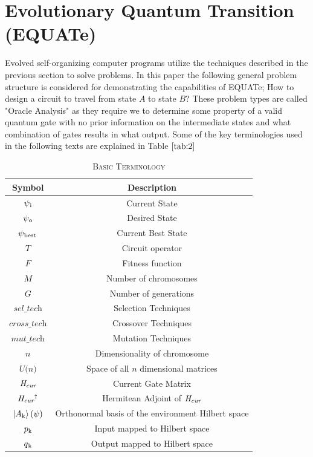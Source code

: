 \documentclass[conference]{IEEEtran}
\begin{document}
\section{Evolutionary Quantum Transition (EQUATe)}

Evolved self-organizing computer programs \cite{self} utilize the techniques described in the previous section to solve problems. In this paper the following general problem structure is considered for demonstrating the capabilities of EQUATe; How to design a circuit to travel from state $\textit{A}$ to state $\textit{B}$? These problem types are called "Oracle Analysis" \cite{oracle} as they require we to determine some property of a valid quantum gate with no prior information on the intermediate states and what combination of gates results in what output. Some of the key terminologies used in the following texts are explained in Table $\ref{tab:2}$



\begin{table}[!t]
\caption{\textsc{Basic Terminology}}
\label{tab:2}
\centering
{
\begin{tabular}{| c | c |}
\hline
Symbol  & Description \\
\hline
$\psi\textsubscript{i}$ & Current State \\ 
$\psi\textsubscript{o}$ & Desired State \\
$\psi\textsubscript{best}$ & Current Best State \\
$\textit{T}$ & Circuit operator\\
$\textit{F}$ & Fitness function\\
$\textit{M}$ & Number of chromosomes\\
$\textit{G}$ & Number of generations\\
$\textit{sel\_tech}$ & Selection Techniques\\
$\textit{cross\_tech}$ & Crossover Techniques\\
$\textit{mut\_tech}$ & Mutation Techniques\\
$\textit{n}$ & Dimensionality of chromosome\\
$\textit{U(n)}$ & Space of all $\textit{n}$ dimensional matrices\\
$\textit{H\textsubscript{cur}}$ & Current Gate Matrix\\
$\textit{H\textsubscript{cur}\textsuperscript{$\dagger$}}$ & Hermitean Adjoint of $\textit{H\textsubscript{cur}}$\\
$\ket{A\textsubscript{k}}(\psi)$ & Orthonormal basis of the environment Hilbert space\\
$p\textsubscript{k}$ & Input mapped to Hilbert space\\
$q\textsubscript{k}$ & Output mapped to Hilbert space\\
\hline
\end{tabular}
}
\end{table}
\end{document}
